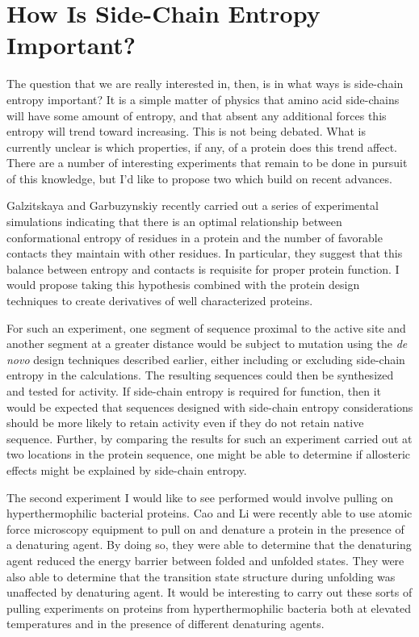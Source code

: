 \section*{How Is Side-Chain Entropy Important?}
\label{sec:how_is_side_chain_entropy_important_}
The question that we are really interested in, then, is in what ways is side-chain entropy important? It is a simple matter of physics that amino acid side-chains will have some amount of entropy, and that absent any additional forces this entropy will trend toward increasing. This is not being debated. What is currently unclear is which properties, if any, of a protein does this trend affect. There are a number of interesting experiments that remain to be done in pursuit of this knowledge, but I'd like to propose two which build on recent advances.

Galzitskaya and Garbuzynskiy recently carried out a series of experimental simulations indicating that there is an optimal relationship between conformational entropy of residues in a protein and the number of favorable contacts they maintain with other residues\cite{Galzitskaya:2006p35}. In particular, they suggest that this balance between entropy and contacts is requisite for proper protein function. I would propose taking this hypothesis combined with the protein design techniques to create derivatives of well characterized proteins.

For such an experiment, one segment of sequence proximal to the active site and another segment at a greater distance would be subject to mutation using the \emph{de novo} design techniques described earlier, either including or excluding side-chain entropy in the calculations. The resulting sequences could then be synthesized and tested for activity. If side-chain entropy is required for function, then it would be expected that sequences designed with side-chain entropy considerations should be more likely to retain activity even if they do not retain native sequence. Further, by comparing the results for such an experiment carried out at two locations in the protein sequence, one might be able to determine if allosteric effects might be explained by side-chain entropy.

The second experiment I would like to see performed would involve pulling on hyperthermophilic bacterial proteins. Cao and Li were recently able to use atomic force microscopy equipment to pull on and denature a protein in the presence of a denaturing agent\cite{Cao:2008p142}. By doing so, they were able to determine that the denaturing agent reduced the energy barrier between folded and unfolded states. They were also able to determine that the transition state structure during unfolding was unaffected by denaturing agent. It would be interesting to carry out these sorts of pulling experiments on proteins from hyperthermophilic bacteria both at elevated temperatures and in the presence of different denaturing agents.

